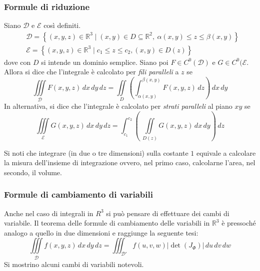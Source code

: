 \subsubsection{Formule di riduzione}
Siano $\mathcal{D}$ e $\mathcal{E}$ così definiti.
\begin{align}
    &\mathcal{D}=\left\{(x,y,z) \in \mathbb{R}^3 \mid (x,y) \in D \subseteq \mathbb{R}^2,\ \alpha(x, y)\leq z \leq \beta(x,y) \right\}\\
    &\mathcal{E}= \left\{(x,y,z) \in \mathbb{R}^3 \mid c_1\leq z \leq c_2, (x,y) \in D(z)\right\}
\end{align}
dove con $D$ si intende un dominio semplice. Siano poi $F \in C^0(\mathcal{D})$ e $G \in C^0(\mathcal{E}$.
Allora si dice che l'integrale è calcolato per \textit{fili paralleli} a $z$ se
\begin{equation}
    \iiint\limits_{\mathcal{D}} F(x,y,z)\, dx\, dy\,dz= \iint\limits_{D}{\left(\int_{\alpha(x,y)}^{\beta(x,y)}{F(x,y,z)\, dz}\right)}\,dx\, dy
\end{equation}
In alternativa, si dice che l'integrale è calcolato per \textit{strati paralleli} al piano $xy$ se
\begin{equation}
\iiint\limits_{\mathcal{E}}{G(x,y,z)\, dx\,dy\,dz} = \int_{c_1}^{c_2}{\left(\ \iint\limits_{D(z)}{G(x,y,z) \, dx\,dy} \right)\, dz}
\end{equation}
\begin{oss}    
Si noti che integrare (in due o tre dimensioni) sulla costante $1$ equivale a calcolare la misura dell'insieme di integrazione ovvero, nel primo caso, calcolarne l'area, nel secondo, il volume.
\end{oss}
\subsubsection{Formule di cambiamento di variabili}
Anche nel caso di integrali in $R^3$ si può pensare di effettuare dei cambi di variabile. Il teorema delle formule di cambiamento delle variabili in $\mathbb{R}^3$ è pressoché analogo a quello in due dimensioni e raggiunge la seguente tesi:
\begin{equation}
    \iiint\limits_{\mathcal{D}}{f(x,y,z)}\,dx\,dy\,dz=\iiint_{\mathcal{D}'}{f(u,v,w)|\det(J_\Phi)|}\,du\,dv\,dw
\end{equation}
Si mostrino alcuni cambi di variabili notevoli.

